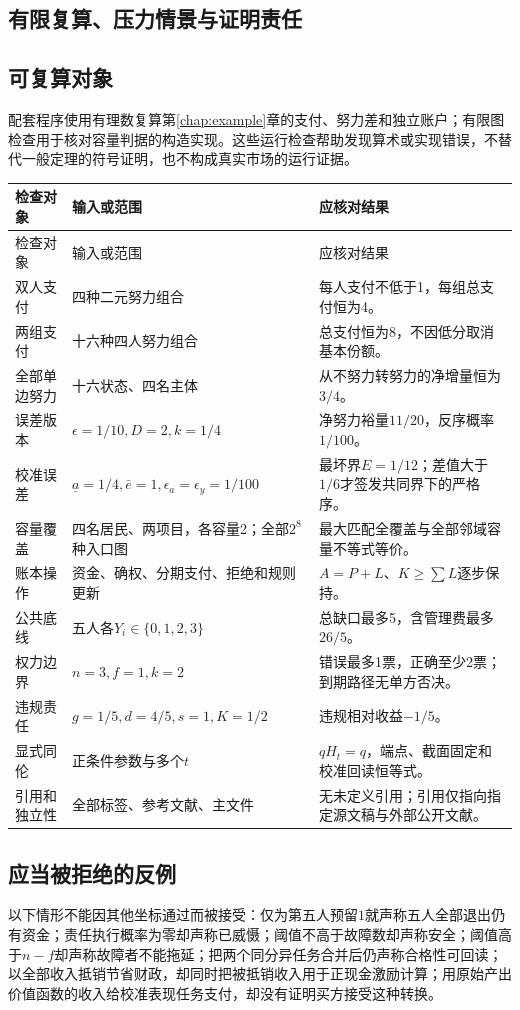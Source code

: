 \documentclass[12pt,a4paper,openany]{report}
\begin{document}
\begin{CJK*}{UTF8}{gkai}
\chapter{有限复算、压力情景与证明责任}
\label{app:checks}
\section{可复算对象}
配套程序使用有理数复算第\ref{chap:example}章的支付、努力差和独立账户；有限图检查用于核对容量判据的构造实现。这些运行检查帮助发现算术或实现错误，不替代一般定理的符号证明，也不构成真实市场的运行证据。
\begin{longtable}{L{0.19\textwidth}L{0.38\textwidth}L{0.33\textwidth}}
\toprule 检查对象 & 输入或范围 & 应核对结果\\\midrule\endfirsthead
\toprule 检查对象 & 输入或范围 & 应核对结果\\\midrule\endhead
双人支付 & 四种二元努力组合 & 每人支付不低于1，每组总支付恒为4。\\
两组支付 & 十六种四人努力组合 & 总支付恒为8，不因低分取消基本份额。\\
全部单边努力 & 十六状态、四名主体 & 从不努力转努力的净增量恒为$3/4$。\\
误差版本 & $\epsilon=1/10,D=2,k=1/4$ & 净努力裕量$11/20$，反序概率$1/100$。\\
校准误差 & $\underline a=1/4,\bar e=1,\epsilon_a=\epsilon_y=1/100$ & 最坏界$E=1/12$；差值大于$1/6$才签发共同界下的严格序。\\
容量覆盖 & 四名居民、两项目，各容量2；全部$2^8$种入口图 & 最大匹配全覆盖与全部邻域容量不等式等价。\\
账本操作 & 资金、确权、分期支付、拒绝和规则更新 & $A=P+L$、$K\ge\sum L$逐步保持。\\
公共底线 & 五人各$Y_i\in\{0,1,2,3\}$ & 总缺口最多5，含管理费最多$26/5$。\\
权力边界 & $n=3,f=1,k=2$ & 错误最多1票，正确至少2票；到期路径无单方否决。\\
违规责任 & $g=1/5,d=4/5,s=1,K=1/2$ & 违规相对收益$-1/5$。\\
显式同伦 & 正条件参数与多个$t$ & $qH_t=q$，端点、截面固定和校准回读恒等式。\\
引用和独立性 & 全部标签、参考文献、主文件 & 无未定义引用；引用仅指向指定源文稿与外部公开文献。\\\bottomrule
\end{longtable}

\section{应当被拒绝的反例}
以下情形不能因其他坐标通过而被接受：仅为第五人预留$1$就声称五人全部退出仍有资金；责任执行概率为零却声称已威慑；阈值不高于故障数却声称安全；阈值高于$n-f$却声称故障者不能拖延；把两个同分异任务合并后仍声称合格性可回读；以全部收入抵销节省财政，却同时把被抵销收入用于正现金激励计算；用原始产出价值函数的收入给校准表现任务支付，却没有证明买方接受这种转换。


\end{CJK*}
\end{document}
